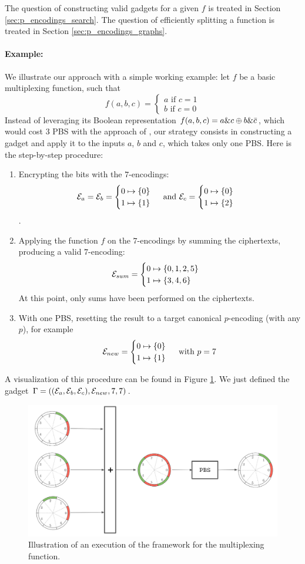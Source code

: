 The question of constructing valid gadgets for a given $f$ is treated in Section \ref{sec:p_encodings_search}. The question of efficiently splitting a function is treated in Section \ref{sec:p_encodings_graphs}.


\paragraph{Example:} We illustrate our approach with a simple working example: let $f$ be a basic multiplexing function, such that  $$
f(a, b, c) = \begin{cases}
    a \text{ if } c = 1\\
    b \text{ if } c = 0
\end{cases}
$$
Instead of leveraging its Boolean representation $f(a, b, c) = a \& c \oplus b \& \Bar{c}$, which would cost 3 PBS with the approach of \cite{JC:CGGI20}, our strategy consists in constructing a gadget and apply it to the inputs $a$, $b$ and $c$, which takes only one PBS. Here is the step-by-step procedure:

\begin{enumerate}
    \item Encrypting the bits with the $7$-encodings:\[\mathcal{E}_a = \mathcal{E}_b = \begin{cases} 0 \mapsto \{0\} \\ 1 \mapsto \{1\} \end{cases} \text{ and } \mathcal{E}_c = \begin{cases} 0 \mapsto \{0\} \\ 1 \mapsto \{2\} \end{cases}\].
    \item Applying the function $f$ on the $7$-encodings by summing the ciphertexts, producing a valid $7$-encoding:\[\mathcal{E}_{sum} = \begin{cases} 0 \mapsto \{0, 1, 2, 5\} \\ 1 \mapsto \{3, 4, 6\} \end{cases}\] At this point, only sums have been performed on the ciphertexts.
    \smallskip
    \item With one PBS, resetting the result to a target canonical $p$-encoding (with any $p$), for example \[\mathcal{E}_{new} = \begin{cases} 0 \mapsto \{0\} \\ 1 \mapsto \{1\} \end{cases} \text{ with } p=7\]
\end{enumerate}

A visualization of this procedure can be found in Figure \ref{fig:illustration}. We just defined the gadget $\Gamma = \left ( (\mathcal{E}_a, \mathcal{E}_b, \mathcal{E}_c), \mathcal{E}_{new}, 7, 7\right )$.

\begin{figure}
    \centering
    \includegraphics[width=\linewidth]{img/to_harmonize/illustration_framework.png}
    \caption{Illustration of an execution of the framework for the multiplexing function.}
    \label{fig:illustration}
\end{figure}


